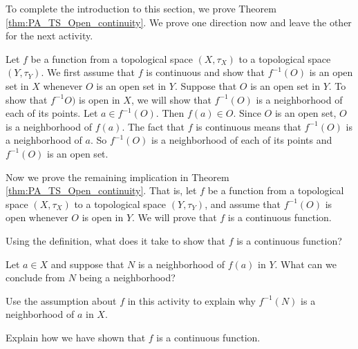 To complete the introduction to this section, we prove Theorem \ref{thm:PA_TS_Open_continuity}. We prove one direction now and leave the other for the next activity. 

Let $f$ be a function from a topological space $(X, \tau_X)$ to a topological space $(Y, \tau_Y)$. We first assume that $f$ is continuous and show that $f^{-1}(O)$ is an open set in $X$ whenever $O$ is an open set in $Y$. Suppose that $O$ is an open set in $Y$. To show that $f^{-1}O)$ is open in $X$, we will show that $f^{-1}(O)$ is a neighborhood of each of its points. Let $a \in f^{-1}(O)$. Then $f(a) \in O$. Since $O$ is an open set, $O$ is a neighborhood of $f(a)$. The fact that $f$ is continuous means that $f^{-1}(O)$ is a neighborhood of $a$. So $f^{-1}(O)$ is a neighborhood of each of its points and $f^{-1}(O)$ is an open set.

\begin{activity} Now we prove the remaining implication in Theorem \ref{thm:PA_TS_Open_continuity}. That is, let $f$ be a function from a topological space $(X, \tau_X)$ to a topological space $(Y, \tau_Y)$, and assume that $f^{-1}(O)$ is open whenever $O$ is open in $Y$. We will prove that $f$ is a continuous function.

\ba

\item Using the definition, what does it take to show that $f$ is a continuous function?

\item Let $a \in X$ and suppose that $N$ is a neighborhood of $f(a)$ in $Y$. What can we conclude from $N$ being a neighborhood?

\item Use the assumption about $f$ in this activity to explain why $f^{-1}(N)$ is a neighborhood of $a$ in $X$. 

\item Explain how we have shown that $f$ is a continuous function.

\ea

\end{activity}

